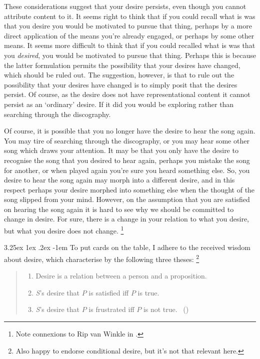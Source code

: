 \documentclass[10pt]{article}
\makeatletter
\renewcommand\paragraph{\@startsection{paragraph}{5}{\z@}%
  {3.25ex \@plus1ex \@minus.2ex}%
  {-1em}%
  {\normalfont\normalsize\bfseries}}
\makeatother
\begin{document}
These considerations suggest that your desire persists, even though you cannot attribute content to it.
It seems right to think that if you could recall what is was that you desire you would be motivated to pursue that thing, perhaps by a more direct application of the means you're already engaged, or perhaps by some other means.
It seems more difficult to think that if you could recalled what is was that you \emph{desired}, you would be motivated to pursue that thing.
Perhaps this is because the latter formulation permits the possibility that your desires have changed, which should be ruled out.
The suggestion, however, is that to rule out the possibility that your desires have changed is to simply posit that the desires persist.
Of course, as the desire does not have representational content it cannot persist as an `ordinary' desire.
If it did you would be exploring rather than searching through the discography.

Of course, it is possible that you no longer have the desire to hear the song again.
You may tire of searching through the discography, or you may hear some other song which draws your attention.
It may be that you only have the desire to recognise the song that you desired to hear again, perhaps you mistake the song for another, or when played again you're sure you heard something else.
So, you desire to hear the song again may morph into a different desire, and in this respect perhaps your desire morphed into something else when the thought of the song slipped from your mind.
However, on the assumption that you are satisfied on hearing the song again it is hard to see why we should be committed to change in desire.
For sure, there is a change in your relation to what you desire, but what you desire does not change.\nolinebreak
\footnote{\color{red} Note connexions to Rip van Winkle in \textcite{Perry:1997aa}.}

\paragraph{ }
To put cards on the table, I adhere to the received wisdom about desire, which \citeauthor{McDaniel:2008aa} characterise by the following three theses:\nolinebreak
\footnote{\color{red} Also happy to endorse conditional desire, but it's not that relevant here.}
\begin{quote}
  \begin{enumerate}[label=RW\arabic*., ref=(RW\arabic*)]
  \item Desire is a relation between a person and a proposition.
  \item \emph{S}'s desire that \(P\) is satisfied iff \(P\) is true.
  \item \emph{S}'s desire that \(P\) is frustrated iff \(P\) is not true.\nolinebreak
    \mbox{ }\hfill(\citeyear[269]{McDaniel:2008aa})
  \end{enumerate}
\end{quote}
\end{document}
